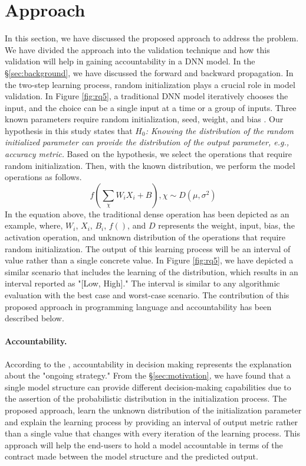 \section{Approach}
\label{sec:approach}
In this section, we have discussed the proposed approach to address the problem. We have divided the approach into the validation technique and how this validation will help in gaining accountability in a DNN model. In the \S\ref{sec:background}, we have discussed the forward and backward propagation. In the two-step learning process, random initialization plays a crucial role in model validation. In Figure \ref{fig:rq5}, a traditional DNN model iteratively chooses the input, and the choice can be a single input at a time or a group of inputs. Three known parameters require random initialization, seed, weight, and bias \cite{sutskever2013importance}. Our hypothesis in this study states that \emph{$H_0$: Knowing the distribution of the random initialized parameter can provide the distribution of the output parameter, e.g., accuracy metric.} Based on the hypothesis, we select the operations that require random initialization. Then, with the known distribution, we perform the model operations as follows.
\begin{equation}
f(\sum_{\chi}{W_iX_i+B}), \chi\sim D(\mu, \sigma^2)
\end{equation}
In the equation above, the traditional dense operation has been depicted as an example, where, $W_i$, $X_i$, $B_i$, $f()$, and $D$ represents the weight, input, bias, the activation operation, and unknown distribution of the operations that require random initialization. The output of this learning process will be an interval of value rather than a single concrete value. In Figure \ref{fig:rq5}, we have depicted a similar scenario that includes the learning of the distribution, which results in an interval reported as "[Low, High]." The interval is similar to any algorithmic evaluation with the best case and worst-case scenario. 
The contribution of this proposed approach in programming language and accountability has been described below.
\paragraph{\textbf{Accountability.}} According to the \cite{veale2018fairness}, accountability in decision making represents the explanation about the "ongoing strategy." From the \S\ref{sec:motivation}, we have found that a single model structure can provide different decision-making capabilities due to the assertion of the probabilistic distribution in the initialization process. The proposed approach, learn the unknown distribution of the initialization parameter and explain the learning process by providing an interval of output metric rather than a single value that changes with every iteration of the learning process. This approach will help the end-users to hold a model accountable in terms of the contract made between the model structure and the predicted output.
